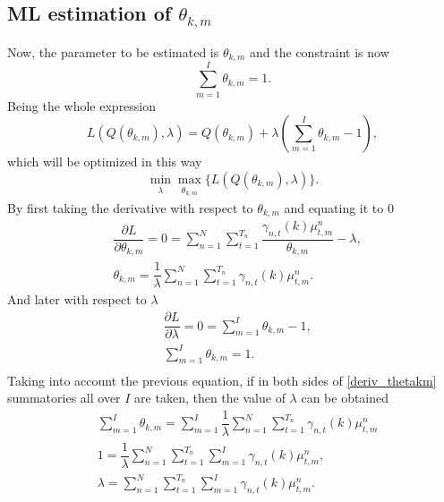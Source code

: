 \documentclass[12pt]{article}%
\begin{document}
\subsection{ML estimation of $\theta_{k,m}$}
Now, the parameter to be estimated is $\theta_{k,m}$ and the constraint is now
\begin{equation}
\label{constraint_thetakm}
\sum \limits_{m=1}^{I} \theta_{k,m} = 1.
\end{equation}
Being the whole expression
\begin{equation}
\label{lagrange_thetakm}
L\left( Q(\theta_{k,m}),\lambda \right) = Q(\theta_{k,m}) + \lambda \left( \sum \limits_{m=1}^{I} \theta_{k,m} - 1 \right),
\end{equation}
which will be optimized in this way
\begin{equation}
\label{minmax_lagrange_thetakm}
\min_{\substack{\lambda}} \max_{\substack{\theta_{k,m}}} \lbrace L\left( Q(\theta_{k,m}),\lambda \right) \rbrace.
\end{equation}
By first taking the derivative with respect to $\theta_{k,m}$ and equating it to 0
\begin{equation}
\label{deriv_thetakm}
\begin{split}
& \dfrac{\partial L}{\partial \theta_{k,m}} = 0 = \sum \limits_{n=1}^{N}\sum _ { t = 1 } ^ { T _ { n } } \dfrac{\gamma_{n,t}(k)\mu_{t,m}^{n}}{\theta_{k,m}} - \lambda, \\
& \theta_{k,m} = \dfrac{1}{\lambda} \sum \limits_{n=1}^{N} \sum _ { t = 1 } ^ { T _ { n } }\gamma_{n,t}(k)\mu_{t,m}^{n}.
\end{split}
\end{equation}
And later with respect to $\lambda$
\begin{equation}
\begin{split}
& \dfrac{\partial L}{\partial \lambda} = 0 = \sum \limits_{m=1}^{I} \theta_{k,m} - 1,\\
& \sum \limits_{m=1}^{I} \theta_{k,m} = 1.\\
\end{split}
\end{equation}
Taking into account the previous equation, if in both sides of \eqref{deriv_thetakm} summatories all over $I$ are taken, then the value of $\lambda$ can be obtained
\begin{equation}
\begin{split}
& \sum \limits_{m=1}^{I}\theta_{k,m} = \sum \limits_{m=1}^{I} \dfrac{1}{\lambda} \sum \limits_{n=1}^{N}\sum _ { t = 1 } ^ { T _ { n } } \gamma_{n,t}(k)\mu_{t,m}^{n}\\
& 1 = \dfrac{1}{\lambda} \sum \limits_{n=1}^{N}\sum _ { t = 1 } ^ { T _ { n } }\sum \limits_{m=1}^{I}\gamma_{n,t}(k)\mu_{t,m}^{n},\\
& \lambda = \sum \limits_{n=1}^{N}\sum \limits_{ t = 1 } ^ { T _ { n }}\sum \limits_{m=1}^{I}\gamma_{n,t}(k)\mu_{t,m}^{n}.\\
\end{split}
\end{equation}
\end{document}
